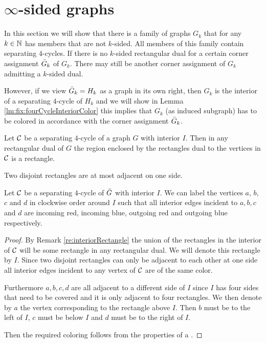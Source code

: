 
\section{$\mathbf{\infty}$-sided graphs}
  \label{s:fix}
  In this section we will show that there is a family of graphs $G_k$ that for any $k \in \mathbb{N}$ has members that are not $k$-sided. All members of this family contain separating $4$-cycles.
  If there is no $k$-sided rectangular dual for a certain corner assignment $\bar{G}_k$ of $G_k$. There may still be another corner assignment of $G_k$ admitting a $k$-sided dual.

  However, if we view $\bar{G}_k = H_k$ as a graph in its own right, then $G_k$ is the interior of a separating $4$-cycle of $H_k$ and we will show in Lemma \ref{lm:fix:fourCycleInteriorColor} this implies that $G_k$ (as induced subgraph) has to be colored in accordance with the corner assignment $\bar{G}_k$.

  \begin{remark}
  \label{re:interiorRectangle}
  Let $\mathcal{C}$ be a separating $4$-cycle of a graph $G$ with interior $I$. Then in any rectangular dual of $G$ the region enclosed by the rectangles dual to the vertices in $\mathcal{C}$ is a rectangle.
  \end{remark}

  \begin{remark}
  \label{re:disjointRectanglesOnlyHaveOneAdjecentSide}
  Two disjoint rectangles are at most adjacent on one side.
  \end{remark}

  \begin{lemma}
  \label{lm:fix:fourCycleInteriorColor}
  Let $\mathcal{C}$ be a separating $4$-cycle of $\bar{G}$ with interior $I$. We can label the vertices $a$, $b$, $c$ and $d$ in clockwise order around $I$ such that all interior edges incident to $a, b, c$ and $d$ are incoming red, incoming blue, outgoing red and outgoing blue respectively.
  \end{lemma}

  \begin{proof}
  By Remark \ref{re:interiorRectangle} the union of the rectangles in the interior of $\mathcal{C}$ will be some rectangle in any rectangular dual. We will denote this rectangle by $I$. Since two disjoint rectangles can only be adjacent to each other at one side all interior edges incident to any vertex of $\mathcal{C}$ are of the same color.

  Furthermore $a, b, c, d$ are all adjacent to a different side of $I$ since $I$ has four sides that need to be covered and it is only adjacent to four rectangles. We then denote by $a$ the vertex corresponding to the rectangle above $I$. Then $b$ must be to the left of $I$, $c$ must be below $I$ and $d$ must be to the right of $I$.

  Then the required coloring follows from the properties of a \rel.

  \end{proof}

